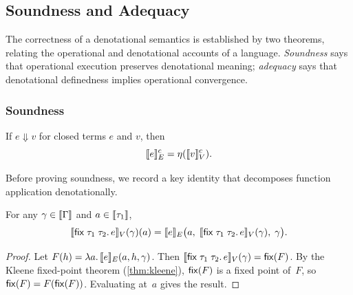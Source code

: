 \subsection{Soundness and Adequacy}
\label{sec:bg-adequacy}

The correctness of a denotational semantics is established by two
theorems, relating the operational and denotational accounts of a
language.  \emph{Soundness} says that operational execution preserves
denotational meaning; \emph{adequacy} says that denotational definedness
implies operational convergence.

\subsubsection*{Soundness}

\begin{theorem}[Soundness]
\label{thm:soundness}
If\/ $e \Downarrow v$ for closed terms $e$ and $v$, then
\[
  \llbracket e \rrbracket^c_E = \eta(\llbracket v \rrbracket^c_V).
\]
\end{theorem}

Before proving soundness, we record a key identity that decomposes
function application denotationally.

\begin{lemma}
\label{lem:fix-unfold}
For any $\gamma \in \llbracket \Gamma \rrbracket$ and $a \in \llbracket \tau_1 \rrbracket$,
\[
  \llbracket \mathsf{fix}\;\tau_1\;\tau_2.\,e \rrbracket_V(\gamma)(a)
  = \llbracket e \rrbracket_E\bigl(a,\;
    \llbracket \mathsf{fix}\;\tau_1\;\tau_2.\,e \rrbracket_V(\gamma),\;
    \gamma\bigr).
\]
\end{lemma}
\begin{proof}
Let $F(h) = \lambda a.\, \llbracket e \rrbracket_E(a, h, \gamma)$.  Then
$\llbracket \mathsf{fix}\;\tau_1\;\tau_2.\,e \rrbracket_V(\gamma) = \mathsf{fix}(F)$.
By the Kleene fixed-point theorem (\cref{thm:kleene}),
$\mathsf{fix}(F)$ is a fixed point of~$F$, so
$\mathsf{fix}(F) = F(\mathsf{fix}(F))$.  Evaluating at~$a$ gives the result.
\end{proof}

